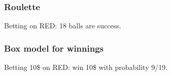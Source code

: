 \documentclass[handout]{beamer}
\begin{document}
   \begin{frame}
   \frametitle{Roulette}
   \begin{center}
   \end{center}
   Betting on {\color{red} RED}: 18 balls are success.
   \end{frame}



   \begin{frame}
   \frametitle{Box model for winnings}
   \begin{center}
   \end{center}
   Betting 10\$ on {\color{red} RED}: win 10\$ with probability 9/19.
   \end{frame}

\end{document}
